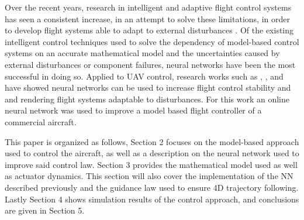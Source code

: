 Over the recent years, research in intelligent and adaptive flight control systems has seen a consistent increase, in an attempt to solve these limitations, in order to develop flight systems able to adapt to external disturbances \cite{SotA_IFCS}. Of the existing intelligent control techniques used to solve the dependency of model-based control systems on an accurate mathematical model and the uncertainties caused by external disturbances or component failures, neural networks have been the most successful in doing so. Applied to UAV control, research works such as \cite{online_adaptiveNN}, \cite{UAV_adaptive}, \cite{UAV_adaptive2} and \cite{quad_NLI+NN} have showed neural networks can be used to increase flight control stability and and rendering flight systems adaptable to disturbances. For this work an online neural network was used to improve a model based flight controller of a commercial aircraft. 

This paper is organized as follows, Section 2 focuses on the model-based approach used to control the aircraft, as well as a description on the neural network used to improve said control law. Section 3 provides the mathematical model used as well as actuator dynamics. This section will also cover the implementation of the NN described previously and the guidance law used to ensure 4D trajectory following. Lastly Section 4 shows simulation results of the control approach, and conclusions are given in Section 5.